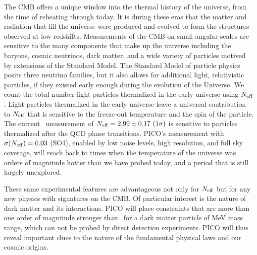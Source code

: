 \documentclass[PICOReport.tex]{subfiles}
\begin{document}
The CMB offers a unique window into the thermal history of the universe, from the time of reheating through today.  It is during these eras that the matter and radiation that fill the universe were produced and evolved to form the structures observed at low redshifts.  Measurements of the CMB on small angular scales are sensitive to the many components that make up the universe including the baryons, cosmic neutrinos, dark matter, and a wide variety of particles motived by extensions of the Standard Model.  The Standard Model of particle physics posits three neutrino families, but it also allows for additional light, relativistic particles, if they existed early enough during the evolution of the Universe.   We count the total number light particles thermalized in the early universe using ${N_{\rm eff}}$. Light particles thermalized in the early universe leave a universal contribution to ${N_{\rm eff}}$ that is sensitive to the freeze-out temperature and the spin of the particle.  The current \planck\ measurement of ${N_{\rm eff}} = 2.99 \pm 0.17 \,\, (1\sigma)$ is sensitive to particles thermalized after the QCD phase transitions. PICO's measurement with $\sigma({N_{\rm eff}})=0.03$ (SO4), enabled by low noise levels, high resolution, and full sky coverage, will reach back to times when the temperature of the universe was orders of magnitude hotter than we have probed today, and a period that is still largely unexplored.   

These same experimental features are advantageous not only for ${N_{\rm eff}}$ but for any new physics with signatures on the CMB. Of particular interest is the nature of dark matter and its interactions. PICO will place constraints that are more than one order of magnitude stronger than \planck\ for a dark matter particle of MeV mass range, which can not be probed by direct detection experiments. PICO will thus reveal important clues to the nature of the fundamental physical laws and our cosmic origins. 


\end{document}
